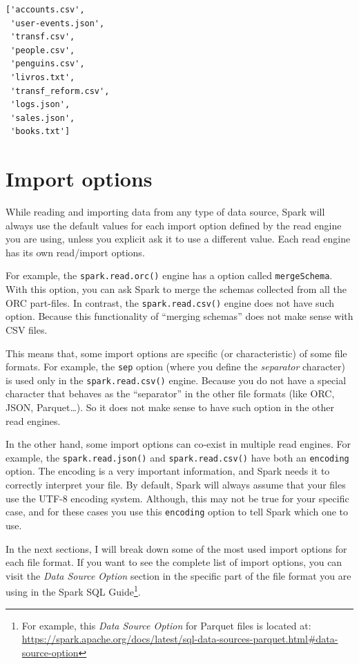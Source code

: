 \documentclass[
  11pt,
  letterpaper,
  DIV=11,
  numbers=noendperiod]{scrreprt}
\begin{document}
\begin{verbatim}
['accounts.csv',
 'user-events.json',
 'transf.csv',
 'people.csv',
 'penguins.csv',
 'livros.txt',
 'transf_reform.csv',
 'logs.json',
 'sales.json',
 'books.txt']
\end{verbatim}

\hypertarget{import-options}{%
\section{Import options}\label{import-options}}

While reading and importing data from any type of data source, Spark
will always use the default values for each import option defined by the
read engine you are using, unless you explicit ask it to use a different
value. Each read engine has its own read/import options.

For example, the \texttt{spark.read.orc()} engine has a option called
\texttt{mergeSchema}. With this option, you can ask Spark to merge the
schemas collected from all the ORC part-files. In contrast, the
\texttt{spark.read.csv()} engine does not have such option. Because this
functionality of ``merging schemas'' does not make sense with CSV files.

This means that, some import options are specific (or characteristic) of
some file formats. For example, the \texttt{sep} option (where you
define the \emph{separator} character) is used only in the
\texttt{spark.read.csv()} engine. Because you do not have a special
character that behaves as the ``separator'' in the other file formats
(like ORC, JSON, Parquet\ldots). So it does not make sense to have such
option in the other read engines.

In the other hand, some import options can co-exist in multiple read
engines. For example, the \texttt{spark.read.json()} and
\texttt{spark.read.csv()} have both an \texttt{encoding} option. The
encoding is a very important information, and Spark needs it to
correctly interpret your file. By default, Spark will always assume that
your files use the UTF-8 encoding system. Although, this may not be true
for your specific case, and for these cases you use this
\texttt{encoding} option to tell Spark which one to use.

In the next sections, I will break down some of the most used import
options for each file format. If you want to see the complete list of
import options, you can visit the \emph{Data Source Option} section in
the specific part of the file format you are using in the Spark SQL
Guide\footnote{For example, this \emph{Data Source Option} for Parquet
  files is located at:
  \url{https://spark.apache.org/docs/latest/sql-data-sources-parquet.html\#data-source-option}}.
\end{document}
